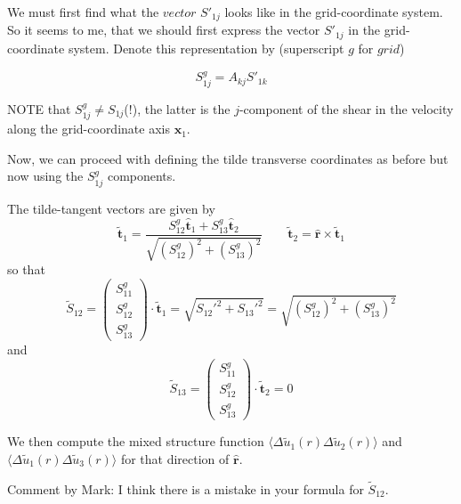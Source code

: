 \documentclass[12pt]{article}
\begin{document}
We must first find what the $vector$ $S'_{1j}$ looks like in the
grid-coordinate system. So it seems to me, that we should first
express the vector $S'_{1j}$ in the grid-coordinate system. Denote
this representation by (superscript $g$ for $grid$)

\begin{equation}S^g_{1j}  =  A_{kj} S'_{1k}\end{equation}

NOTE that $S^g_{1j} \neq S_{1j}$(!), the latter is the $j$-component
of the shear in the velocity along the grid-coordinate axis
$\bm{x}_1$.  

Now, we can proceed with defining the tilde transverse coordinates as before but now using the $S^g_{1j}$ components.
 
The tilde-tangent vectors are given by 
\begin{equation}
\bm{{\tilde t}}_1 = \frac{S^g_{12}  \bm{{\hat t}}_1 +  S^g_{13}  \bm{{\hat t}}_2 }
                         {\sqrt{ (S^g_{12})^2 +  (S^g_{13})^2 }}
\qquad
\bm{{\tilde t}}_2 = \bm{{\hat r}} \times \bm{{\tilde t}}_1
\end{equation}
so that
\begin{equation}
\tilde S_{12} = 
\begin{pmatrix}  S^g_{11} \\
                 S^g_{12} \\
                 S^g_{13} 
\end{pmatrix}
\cdot \bm{{\tilde t}}_1 = 
 \sqrt{ S_{12}'^2 + S_{13}'^2 } =  \sqrt{ (S^g_{12})^2 + (S^g_{13})^2 }
\end{equation}
and 
\begin{equation}
\tilde S_{13} = 
\begin{pmatrix}  S^g_{11} \\
                 S^g_{12} \\
                 S^g_{13} 
\end{pmatrix}
\cdot \bm{{\tilde t}}_2 =  0
\end{equation}


We then compute the mixed structure function $\langle \Delta \tilde u_1 (r) 
\Delta \tilde u_2 (r)\rangle$ and 
$\langle \Delta \tilde u_1 (r) \Delta \tilde u_3 (r)\rangle$ for that direction of $\bm{{\hat r}}$.


Comment by Mark:
  I think there is a mistake in your formula for $\tilde S_{12}$.
\end{document}
